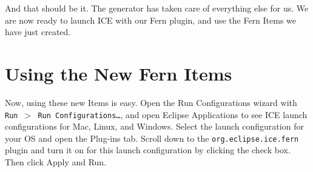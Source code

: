 And that should be it.
The generator has taken care of everything else for us.
We are now ready to launch ICE with our Fern plugin, and use the Fern Items we
have just created.

\section*{Using the New Fern Items}
Now, using these new Items is easy. Open the Run Configurations wizard with
\texttt{Run $>$ Run Configurations\ldots}, and open Eclipse Applications to see ICE
launch configurations for Mac, Linux, and Windows. Select the launch configuration for your OS and open the Plug-ins
tab. Scroll down to the \texttt{org.eclipse.ice.fern} plugin and turn it on for
this launch configuration by clicking the check box. Then click Apply and Run. 

